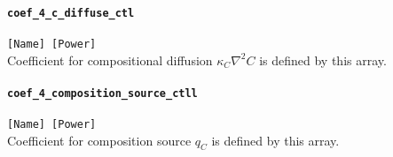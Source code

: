 \paragraph{\tt coef\_4\_c\_diffuse\_ctl}
\label{href_t:coef_4_c_diffuse_ctl}
\verb|[Name] [Power]| \\
Coefficient for compositional diffusion $\displaystyle \kappa_{C} \nabla^{2} C$ is defined by this array.

\paragraph{\tt coef\_4\_composition\_source\_ctll}
\label{href_t:coef_4_composition_source_ctl}
\verb|[Name] [Power]| \\
Coefficient for composition source $\displaystyle q_{C}$ is defined by this array.

%
%
%

